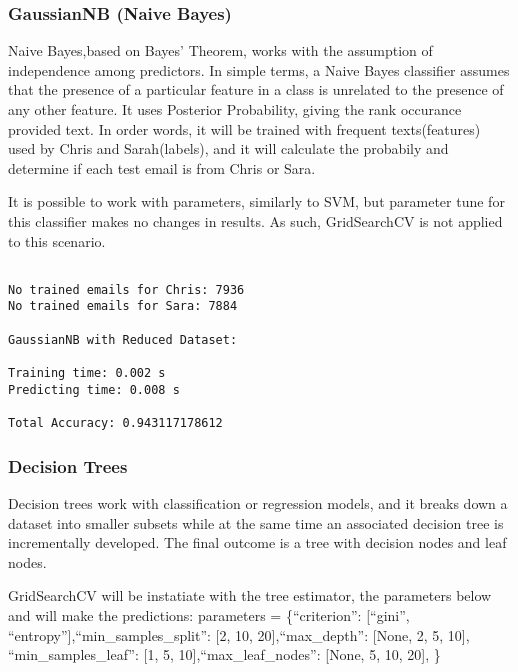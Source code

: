 \documentclass[11pt]{article}
\begin{document}
\begin{multicols}{2}
\begin{Verbatim}[commandchars=\\\{\}]
    \end{Verbatim}

    \subsubsection{GaussianNB (Naive Bayes)}\label{gaussiannb-naive-bayes}

Naive Bayes,based on Bayes' Theorem, works with the assumption of
independence among predictors. In simple terms, a Naive Bayes classifier
assumes that the presence of a particular feature in a class is
unrelated to the presence of any other feature. It uses Posterior
Probability, giving the rank occurance provided text. In order words, it
will be trained with frequent texts(features) used by Chris and
Sarah(labels), and it will calculate the probabily and determine if each
test email is from Chris or Sara.

It is possible to work with parameters, similarly to SVM, but parameter
tune for this classifier makes no changes in results. As such,
GridSearchCV is not applied to this scenario.


    \begin{Verbatim}[commandchars=\\\{\}]

No trained emails for Chris: 7936
No trained emails for Sara: 7884

GaussianNB with Reduced Dataset:

Training time: 0.002 s
Predicting time: 0.008 s

Total Accuracy: 0.943117178612

    \end{Verbatim}

    \subsubsection{Decision Trees}\label{decision-trees}

Decision trees work with classification or regression models, and it
breaks down a dataset into smaller subsets while at the same time an
associated decision tree is incrementally developed. The final outcome
is a tree with decision nodes and leaf nodes.

GridSearchCV will be instatiate with the tree estimator, the parameters
below and will make the predictions: parameters = \{``criterion'':
{[}``gini'', ``entropy''{]},``min\_samples\_split'': {[}2, 10,
20{]},``max\_depth'': {[}None, 2, 5, 10{]}, ``min\_samples\_leaf'':
{[}1, 5, 10{]},``max\_leaf\_nodes'': {[}None, 5, 10, 20{]}, \}



\end{multicols}
\end{document}

